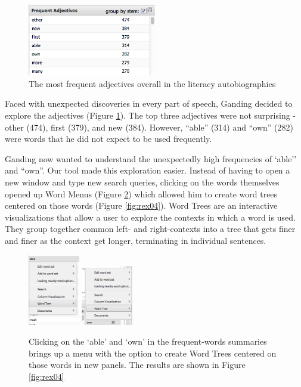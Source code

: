 \documentclass{sig-alternate}
\begin{document}
\begin{figure}
\includegraphics[width=0.5\textwidth]{fig/rex/02.png}
\caption{The most frequent adjectives overall in the literacy autobiographies \label{fig:rex02}}
\end{figure}

Faced with unexpected discoveries in every part of speech, Ganding decided to explore the adjectives (Figure \ref{fig:rex02}). The top three adjectives were not surprising - other (474), first (379), and new (384).  However,  ``able'' (314) and ``own'' (282) were words that he did not expect to be used frequently.

Ganding now wanted to understand the unexpectedly high frequencies of `able'' and ``own''. Our tool made this exploration easier. Instead of having to open a new window and type new search queries, clicking on the words themselves opened up Word Menus (Figure \ref{fig:rex03}) which allowed him to create word trees centered on those words (Figure \ref{fig:rex04}).  Word Trees \cite{wattenberg_word_2008} are an interactive visualizations that allow a user to explore the contexts in which a word is used. They group together common left- and right-contexts into a tree that gets finer and finer as the context get longer, terminating in individual sentences.  
\begin{figure}[h!]
\includegraphics[width=0.2\textwidth]{fig/rex/03.png}
\includegraphics[width=0.2\textwidth]{fig/rex/03b.png}
\caption{Clicking on the `able' and `own' in the frequent-words summaries brings up a menu with the option to create Word Trees centered on those words in new panels. The results are shown in Figure \ref{fig:rex04} \label{fig:rex03}}
\end{figure}
\end{document}
